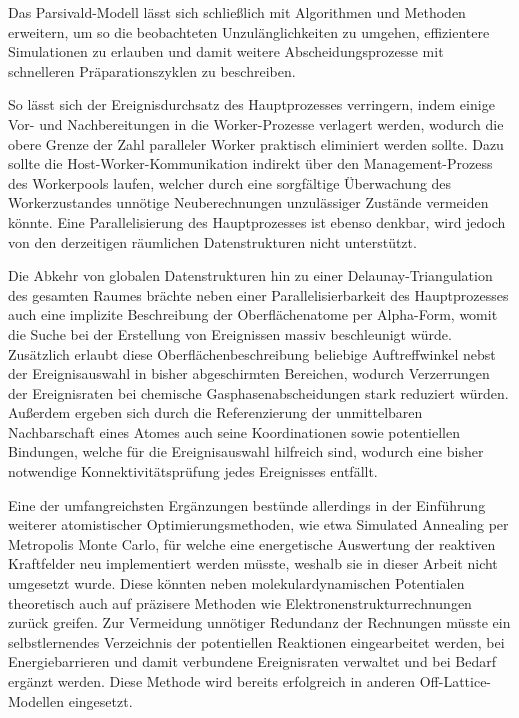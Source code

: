 \vspace{0.5em}

Das Parsivald-Modell lässt sich schließlich mit Algorithmen und Methoden erweitern, um so die beobachteten Unzulänglichkeiten zu umgehen, effizientere Simulationen zu erlauben und damit weitere Abscheidungsprozesse mit schnelleren Präparationszyklen zu beschreiben.

So lässt sich der Ereignisdurchsatz des Hauptprozesses verringern, indem einige Vor- und Nachbereitungen in die Worker-Prozesse verlagert werden, wodurch die obere Grenze der Zahl paralleler Worker praktisch eliminiert werden sollte.
Dazu sollte die Host-\-Worker-\-Kom\-mu\-ni\-ka\-tion indirekt über den Management-Prozess des Workerpools laufen, welcher durch eine sorgfältige Überwachung des Workerzustandes unnötige Neuberechnungen unzulässiger Zustände vermeiden könnte.
Eine Parallelisierung des Hauptprozesses ist ebenso denkbar, wird jedoch von den derzeitigen räumlichen Datenstrukturen nicht unterstützt.

Die Abkehr von globalen Datenstrukturen hin zu einer Delaunay-Triangulation des gesamten Raumes brächte neben einer Parallelisierbarkeit des Hauptprozesses auch eine implizite Beschreibung der Oberflächenatome per Alpha-Form, womit die Suche bei der Erstellung von Ereignissen massiv beschleunigt würde.
Zusätzlich erlaubt diese Oberflächenbeschreibung beliebige Auftreffwinkel nebst der Ereignisauswahl in bisher abgeschirmten Bereichen, wodurch Verzerrungen der Ereignisraten bei chemische Gasphasenabscheidungen stark reduziert würden.
Außerdem ergeben sich durch die Referenzierung der unmittelbaren Nachbarschaft eines Atomes auch seine Koordinationen sowie potentiellen Bindungen, welche für die Ereignisauswahl hilfreich sind, wodurch eine bisher notwendige Konnektivitätsprüfung jedes Ereignisses entfällt.

Eine der umfangreichsten Ergänzungen bestünde allerdings in der Einführung weiterer atomistischer Optimierungsmethoden, wie etwa Simulated Annealing per Metropolis Monte Carlo, für welche eine energetische Auswertung der reaktiven Kraftfelder neu implementiert werden müsste, weshalb sie in dieser Arbeit nicht umgesetzt wurde.
Diese könnten neben molekulardynamischen Potentialen theoretisch auch auf präzisere Methoden wie Elektronenstrukturrechnungen zurück greifen.
Zur Vermeidung unnötiger Redundanz der Rechnungen müsste ein selbstlernendes Verzeichnis der potentiellen Reaktionen eingearbeitet werden, bei Energiebarrieren und damit verbundene Ereignisraten verwaltet und bei Bedarf ergänzt werden.
Diese Methode wird bereits erfolgreich in anderen Off-Lattice-Modellen eingesetzt\cite{biehl_off-lattice_2005,stamatakis_graph-theoretical_2011}.

